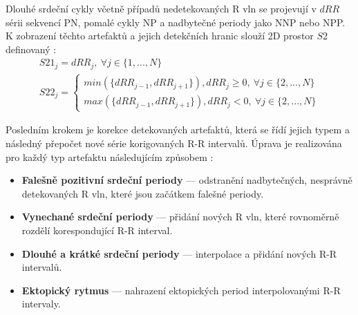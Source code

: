 Dlouhé srdeční cykly včetně případů nedetekovaných R vln se projevují v $dRR$
sérii sekvencí PN, pomalé cykly NP a nadbytečné periody jako NNP nebo NPP. K
zobrazení těchto artefaktů a jejich detekčních hranic slouží 2D prostor $S2$
definovaný \cite{Lipponen2019}:
\begin{gather}
    S21_j = dRR_j, ~\forall j \in \{1,...,N\} \nonumber \\
    S22_j =
    \begin{cases}
        min(\{dRR_{j-1}, dRR_{j+1}\}), dRR_j \geq 0, ~\forall j \in \{2,...,N\} \\
        max(\{dRR_{j-1}, dRR_{j+1}\}), dRR_j < 0, ~\forall j \in \{2,...,N\}
    \end{cases}
    \label{eq:subspace2}
\end{gather}

Posledním krokem je korekce detekovaných artefaktů, která se řídí jejich typem a
následný přepočet nové série korigovaných R-R intervalů. Úprava je realizována
pro každý typ artefaktu následujícím způsobem \cite{Lipponen2019}:
\begin{itemize}
    \item \textbf{Falešně pozitivní srdeční periody} --- odstranění
          nadbytečných, nesprávně detekovaných R vln, které jsou začátkem falešné
          periody.
    \item \textbf{Vynechané srdeční periody} --- přidání nových R vln, které
          rovnoměrně rozdělí korespondující R-R interval.
    \item \textbf{Dlouhé a krátké srdeční periody} --- interpolace a přidání
          nových R-R intervalů.
    \item \textbf{Ektopický rytmus} --- nahrazení ektopických period interpolovanými R-R intervaly.
\end{itemize}

